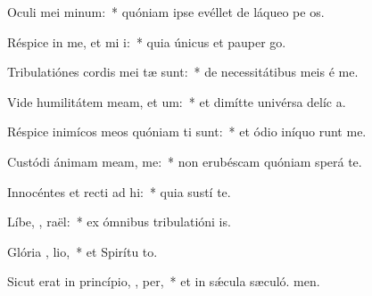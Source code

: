 \item Oculi mei   minum:~* quóniam ipse evéllet de láqueo pe os.
\item Réspice in me, et mi i:~* quia únicus et pauper  go.
\item Tribulatiónes cordis mei tæ sunt:~* de necessitátibus meis é me.
\item Vide humilitátem meam, et  um:~* et dimítte univérsa delíc a.
\item Réspice inimícos meos quóniam ti sunt:~* et ódio iníquo runt me.
\item Custódi ánimam meam,   me:~* non erubéscam quóniam sperá  te.
\item Innocéntes et recti ad hi:~* quia sustí te.
\item Líbe, , raël:~* ex ómnibus tribulatióni is.
\item Glória ,  lio,~* et Spirítu to.
\item Sicut erat in princípio,  ,  per,~* et in sǽcula sæculó. men.
